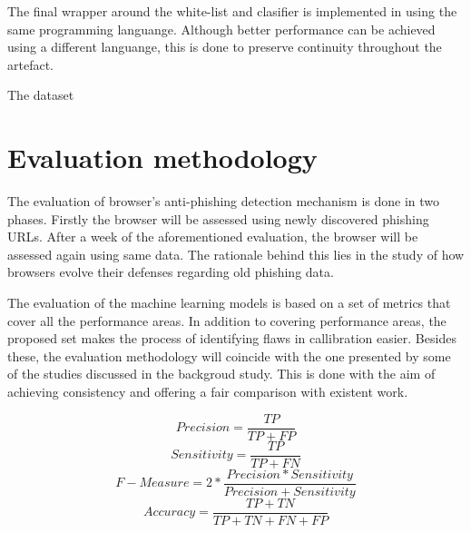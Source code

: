 The final wrapper around the white-list and clasifier is implemented in using the same programming languange. Although better performance can be achieved using a different languange, this is done to preserve continuity throughout the artefact.

The dataset 

\section{Evaluation methodology}
The evaluation of browser's anti-phishing detection mechanism is done in two phases. Firstly the browser will be assessed using newly discovered phishing URLs. After a week of the aforementioned evaluation, the browser will be assessed again using same data. The rationale behind this lies in the study of how browsers evolve their defenses regarding old phishing data.

The evaluation of the machine learning models is based on a set of metrics that cover all the performance areas. In addition to covering performance areas, the proposed set makes the process of identifying flaws in callibration easier. Besides these, the evaluation methodology will coincide with the one presented by some of the studies discussed in the backgroud study. This is done with the aim of achieving consistency and offering a fair comparison with existent work.\newline


\begin{equation}
	\label{eq:PRECISION}
	Precision = \frac{TP}{TP+FP}
\end{equation}
\begin{equation}
	\label{eq:SENSITIVITY}
	Sensitivity = \frac{TP}{TP+FN}
\end{equation}
\begin{equation}
	\label{eq:FMEASURE}
	F-Measure = 2*\frac{Precision * Sensitivity}{Precision + Sensitivity}
\end{equation}
\begin{equation}
	\label{eq:ACCURACY}
	Accuracy = \frac{TP+TN}{TP+TN+FN+FP}
\end{equation}
\newline

